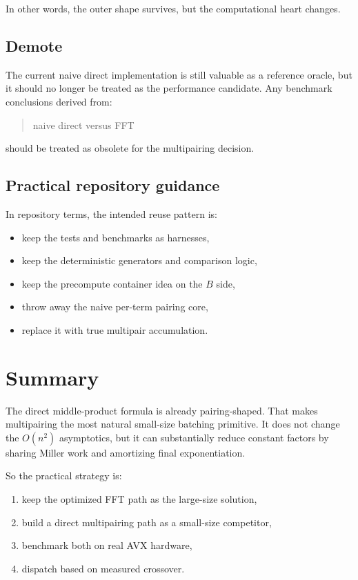 \documentclass[11pt]{article}
\begin{document}
In other words, the outer shape survives, but the computational heart changes.

\subsection{Demote}

The current naive direct implementation is still valuable as a reference
oracle, but it should no longer be treated as the performance candidate.
Any benchmark conclusions derived from:
\begin{quote}
naive direct versus FFT
\end{quote}
should be treated as obsolete for the multipairing decision.

\subsection{Practical repository guidance}

In repository terms, the intended reuse pattern is:
\begin{itemize}[itemsep=0.3em, topsep=0.4em]
  \item keep the tests and benchmarks as harnesses,
  \item keep the deterministic generators and comparison logic,
  \item keep the precompute container idea on the $B$ side,
  \item throw away the naive per-term pairing core,
  \item replace it with true multipair accumulation.
\end{itemize}

\section{Summary}

The direct middle-product formula is already pairing-shaped.
That makes multipairing the most natural small-size batching primitive.
It does not change the $O(n^2)$ asymptotics, but it can substantially reduce
constant factors by sharing Miller work and amortizing final exponentiation.

So the practical strategy is:
\begin{enumerate}[itemsep=0.3em, topsep=0.4em]
  \item keep the optimized FFT path as the large-size solution,
  \item build a direct multipairing path as a small-size competitor,
  \item benchmark both on real AVX hardware,
  \item dispatch based on measured crossover.
\end{enumerate}
\end{document}
